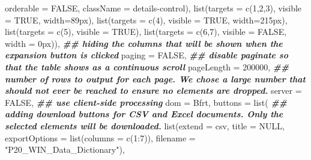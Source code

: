 \documentclass[
]{article}
\newenvironment{Shaded}{\begin{snugshade}}{\end{snugshade}}
\newcommand{\AttributeTok}[1]{\textcolor[rgb]{0.77,0.63,0.00}{#1}}
\newcommand{\ConstantTok}[1]{\textcolor[rgb]{0.00,0.00,0.00}{#1}}
\newcommand{\DecValTok}[1]{\textcolor[rgb]{0.00,0.00,0.81}{#1}}
\newcommand{\DocumentationTok}[1]{\textcolor[rgb]{0.56,0.35,0.01}{\textbf{\textit{#1}}}}
\newcommand{\FunctionTok}[1]{\textcolor[rgb]{0.00,0.00,0.00}{#1}}
\newcommand{\NormalTok}[1]{#1}
\newcommand{\SpecialCharTok}[1]{\textcolor[rgb]{0.00,0.00,0.00}{#1}}
\newcommand{\StringTok}[1]{\textcolor[rgb]{0.31,0.60,0.02}{#1}}
\begin{document}
\begin{Shaded}
\begin{Highlighting}[]
                       \AttributeTok{orderable =} \ConstantTok{FALSE}\NormalTok{, }\AttributeTok{className =} \StringTok{\textquotesingle{}details{-}control\textquotesingle{}}\NormalTok{), }
                  \FunctionTok{list}\NormalTok{(}\AttributeTok{targets =} \FunctionTok{c}\NormalTok{(}\DecValTok{1}\NormalTok{,}\DecValTok{2}\NormalTok{,}\DecValTok{3}\NormalTok{), }\AttributeTok{visible =} \ConstantTok{TRUE}\NormalTok{, }\AttributeTok{width=}\StringTok{\textquotesingle{}89px\textquotesingle{}}\NormalTok{), }
                  \FunctionTok{list}\NormalTok{(}\AttributeTok{targets =} \FunctionTok{c}\NormalTok{(}\DecValTok{4}\NormalTok{), }\AttributeTok{visible =} \ConstantTok{TRUE}\NormalTok{, }\AttributeTok{width=}\StringTok{\textquotesingle{}215px\textquotesingle{}}\NormalTok{), }
                  \FunctionTok{list}\NormalTok{(}\AttributeTok{targets =} \FunctionTok{c}\NormalTok{(}\DecValTok{5}\NormalTok{), }\AttributeTok{visible =} \ConstantTok{TRUE}\NormalTok{), }
                  \FunctionTok{list}\NormalTok{(}\AttributeTok{targets =} \FunctionTok{c}\NormalTok{(}\DecValTok{6}\NormalTok{,}\DecValTok{7}\NormalTok{), }\AttributeTok{visible =} \ConstantTok{FALSE}\NormalTok{, }\AttributeTok{width =} \StringTok{\textquotesingle{}0px\textquotesingle{}}\NormalTok{)), }\DocumentationTok{\#\# hiding the columns that will be shown when the expansion button is clicked}
                \AttributeTok{paging =} \ConstantTok{FALSE}\NormalTok{,    }\DocumentationTok{\#\# disable paginate so that the table shows as a continuous scroll}
                \AttributeTok{pageLength =} \DecValTok{200000}\NormalTok{, }\DocumentationTok{\#\# number of rows to output for each page. We chose a large number that should not ever be reached to ensure no elements are dropped.}
                \AttributeTok{server =} \ConstantTok{FALSE}\NormalTok{,   }\DocumentationTok{\#\# use client{-}side processing}
                \AttributeTok{dom =} \StringTok{\textquotesingle{}Bfrt\textquotesingle{}}\NormalTok{,}
                \AttributeTok{buttons =} \FunctionTok{list}\NormalTok{( }\DocumentationTok{\#\# adding download buttons for CSV and Excel documents. Only the selected elements will be downloaded. }
                  \FunctionTok{list}\NormalTok{(}\AttributeTok{extend =} \StringTok{\textquotesingle{}csv\textquotesingle{}}\NormalTok{, }\AttributeTok{title =} \ConstantTok{NULL}\NormalTok{, }\AttributeTok{exportOptions =} \FunctionTok{list}\NormalTok{(}\AttributeTok{columns =} \FunctionTok{c}\NormalTok{(}\DecValTok{1}\SpecialCharTok{:}\DecValTok{7}\NormalTok{)),}
                       \AttributeTok{filename =} \StringTok{"P20\_WIN\_Data\_Dictionary"}\NormalTok{), }

\end{Highlighting}
\end{Shaded}
\end{document}
